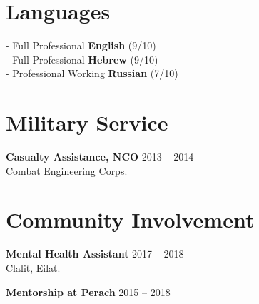 \documentclass[
	12pt,a4paper %
]{article}
\newcommand{\tableentry}[3]{
	\textsc{#1} & #2\expandafter\ifstrequal\expandafter{#3}{}{\\}{\\[5pt]} %
}
\begin{document}
\begin{paracol}{2}
\switchcolumn


\section{Languages}
 - Full Professional \textbf{English} (9/10) \\
 - Full Professional \textbf{Hebrew} (9/10) \\
 - Professional Working \textbf{Russian} (7/10)
\section{Military Service}
\textbf{Casualty Assistance, NCO} \hfill 2013 -- 2014 \\
Combat Engineering Corps.

 \section{Community Involvement}

 \textbf{Mental Health Assistant} \hfill 2017 -- 2018 \\
 Clalit, Eilat.

 \textbf{Mentorship at Perach} \hfill 2015 -- 2018
\end{paracol} %
\end{document}
